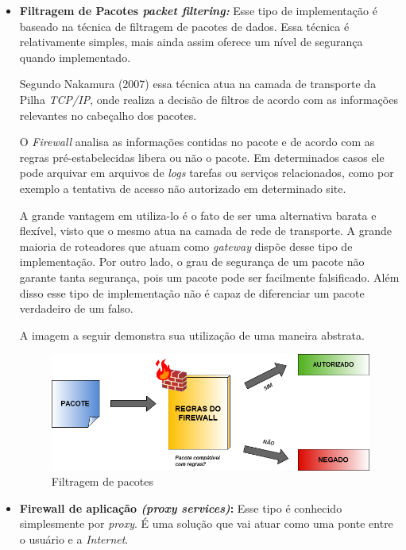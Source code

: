 \begin{itemize}
\item \textbf{Filtragem de Pacotes \textit{packet filtering:}} Esse tipo de implementação é baseado na técnica de filtragem de pacotes de dados. Essa técnica é relativamente simples, mais ainda assim oferece um nível de segurança quando implementado.

Segundo Nakamura (2007) essa técnica atua na camada de transporte da Pilha \textit{TCP/IP}, onde realiza a decisão de filtros de acordo com as informações relevantes no cabeçalho dos pacotes.

O \textit{Firewall} analisa as informações contidas no pacote e de acordo com as regras pré-estabelecidas libera ou não o pacote. Em determinados casos ele pode arquivar em arquivos de \textit{logs} tarefas ou serviços relacionados, como por exemplo a tentativa de acesso não autorizado em determinado site.

A grande vantagem em utiliza-lo é o fato de ser uma alternativa barata e flexível, visto que o mesmo atua na camada de rede de transporte. A grande maioria de roteadores que atuam como \textit{gateway} dispõe desse tipo de implementação. Por outro lado, o grau de segurança de um pacote não garante tanta segurança, pois um pacote pode ser facilmente falsificado. Além disso esse tipo de implementação não é capaz de diferenciar um pacote verdadeiro de um falso.

A imagem a seguir demonstra sua utilização de uma maneira abstrata.

\begin{figure}[!h]
\centering
\includegraphics[width = 15cm]{packetfiltering.png}
\caption{Filtragem de pacotes} 	
\end{figure}

\item \textbf{Firewall de aplicação \textit{(proxy services)}:} Esse tipo é conhecido simplesmente por \textit{proxy}. É uma solução que vai atuar como uma ponte entre o usuário e a \textit{Internet}. 


\end{itemize}
